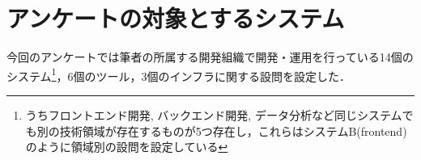 \section{アンケートの対象とするシステム}
今回のアンケートでは筆者の所属する開発組織で開発・運用を行っている14個のシステム\footnote{うちフロントエンド開発, バックエンド開発, データ分析など同じシステムでも別の技術領域が存在するものが5つ存在し，これらはシステムB(frontend)のように領域別の設問を設定している}，6個のツール，3個のインフラに関する設問を設定した．

